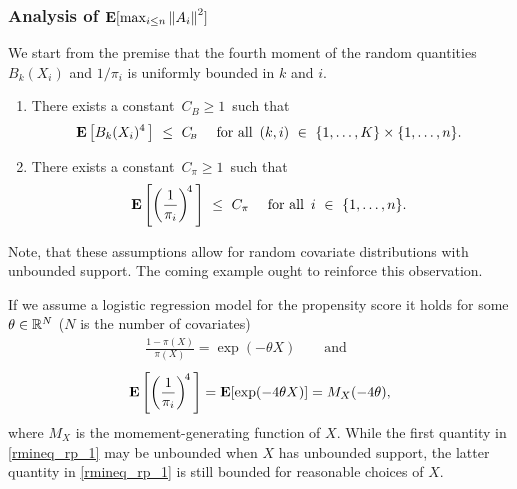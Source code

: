 \subsubsection*{
  Analysis of 
  $
  \mathbf{E}[\max_{i \le n}\left\lVert A_i\right\rVert^2]
  $
}
We start from the premise that the fourth moment of 
the random quantities $B_k(X_i)$ and $1/\pi_i$ is uniformly bounded 
in $k$ and $i$.
\begin{assumptions*}
  \begin{enumerate}[label={(\roman*)}]
    \item
  There exists 
  a constant 
  $
  \,
    C_{\!\scriptscriptstyle B}
  \ge
  1
  \,
  $ such that
  \begin{gather*}
  \E\left[
    B_k(X_i)^{4}
    \,
  \right]
  \ 
  \le
  \ 
    C_{\!\scriptscriptstyle B}
    \quad
    \text{
  for all $\,(k,i)\ \in\  \left\{ 1, \ldots, K \right\}\times \left\{ 1, \ldots, n \right\}$.
    }
  \end{gather*}
  \item
  There exists a constant $\,C_\pi \!\ge 1\,$ such that
  \begin{gather*}
  \E \left[ 
    \left(
      \frac{1}{\pi_{i}}
    \right)^{\!4}
    \,
  \right]
  \ 
  \le
  \ 
  C_\pi
  \quad
  \text{
  for all $\,i\ \in\  \left\{ 1, \ldots, n \right\}$.
  }
  \end{gather*}
  \end{enumerate}
\end{assumptions*}
Note, that these assumptions allow for random covariate distributions with unbounded support. The coming example ought to reinforce this observation.
\begin{remark}
  If we assume a logistic regression model for the propensity score
  it holds for some $\theta \in \mathbb{R}^N$ ($N$ is the number of covariates)
  \begin{gather}
    \label{rmineq_rp_1}
    \frac{1-\pi(X)}{\pi(X)}
    =
    \exp(-\theta X)
    \qquad
    \text{and}
    \qquad
  \end{gather}
  \begin{gather}
  \mathbf{E} \left[ 
    \left(
      \frac{1}{\pi_{i}}
    \right)^{\!4}
    \,
  \right]
    =
    \mathbf{E}
    [
    \exp(-4\theta X)
    ]
    =
    M_X(-4\theta)
    ,
  \end{gather}
  where $M_X$ is the momement-generating function of $X$.
   While the first quantity in \eqref{rmineq_rp_1}
   may be unbounded when $X$ has unbounded support, the latter quantity in \eqref{rmineq_rp_1} is still bounded for reasonable choices of $X$.
\end{remark}


